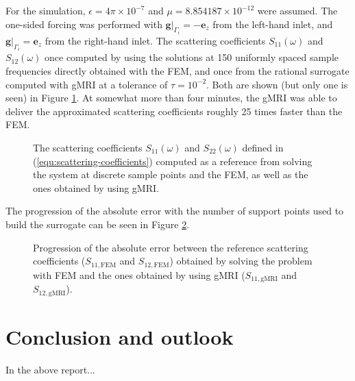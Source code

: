 \documentclass[11pt, a4paper]{article}
\begin{document}
For the simulation, $\epsilon = 4 \pi \times 10^{-7}$ and 
$\mu = 8.854187 \times 10^{-12}$ were assumed. The one-sided forcing
was performed with $\left.\mathbf{g}\right|_{\Gamma_i} = - \mathbf{e}_z$ from the
left-hand inlet, and $\left.\mathbf{g}\right|_{\Gamma_i} = \mathbf{e}_z$ from the
right-hand inlet. The scattering coefficients $S_{11}(\omega)$ and $S_{12}(\omega)$
once computed by using the solutions at 150 uniformly spaced sample frequencies
directly obtained with the \acrshort{FEM},
and once from the rational surrogate computed with \acrshort{gMRI} at a tolerance
of $\tau = 10^{-2}$. Both are shown (but only one is seen) in Figure
\ref{fig:circular-waveguide-scattering}. At somewhat more than four minutes,
the \acrshort{gMRI} was able to deliver the approximated scattering coefficients
roughly 25 times faster than the \acrshort{FEM}.

\begin{figure}[ht]
    \centering
    
    \caption{The scattering coefficients $S_11(\omega)$ and $S_22(\omega)$
    defined in (\ref{equ:scattering-coefficients}) computed as a reference
    from solving the system at discrete sample points and the
    \acrshort{FEM}, as well as the ones obtained by using \acrshort{gMRI}.}
    \label{fig:circular-waveguide-scattering}
\end{figure}

The progression of the
absolute error with the number of support points used to build the surrogate
can be seen in Figure \ref{fig:circular-waveguide-error}.

\begin{figure}[ht]
    \centering
    
    \caption{Progression of the absolute error between the reference scattering
    coefficients ($S_{11, \textrm{FEM}}$ and $S_{12, \textrm{FEM}}$) obtained by solving the problem with \acrshort{FEM} and the 
    ones obtained by using \acrshort{gMRI} ($S_{11, \textrm{gMRI}}$ and $S_{12, \textrm{gMRI}}$).}
    \label{fig:circular-waveguide-error}
\end{figure}
\clearpage

\newpage
\section{Conclusion and outlook}
\label{sec:conclusion}

In the above report...
\end{document}
